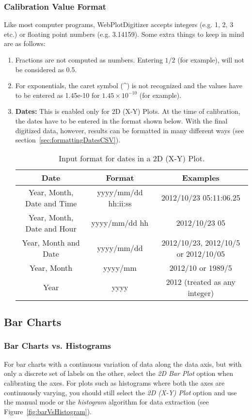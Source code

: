 \documentclass[letterpaper, 11pt]{article}
\begin{document}
\subsubsection{Calibration Value Format}
\label{sec:formattingInput}
Like most computer programs, WebPlotDigitizer accepts integers (e.g. 1, 2, 3 etc.) or floating point numbers (e.g. 3.14159). Some extra things to keep in mind are as follows:
\begin{enumerate}
\item{Fractions are not computed as numbers. Entering $1/2$ (for example), will not be considered as 0.5.}
\item{For exponentials, the caret symbol (\^{}) is not recognized and the values have to be entered as 1.45e-10 for $1.45 \times 10^{-10}$ (for example).}
\item{{\bf Dates:} This is enabled only for 2D (X-Y) Plots. At the time of calibration, the dates have to be entered in the format shown below. With the final digitized data, however, results can be formatted in many different ways (see section~\ref{sec:formattingDatesCSV}).
\begin{center}
\begin{table}[h]	
\caption{Input format for dates in a 2D (X-Y) Plot.}
\begin{tabular}{|c|c|c|}
\hline
Date & Format & Examples\\
\hline
Year, Month, Date and Time & yyyy/mm/dd hh:ii:ss & 2012/10/23 05:11:06.25\\
Year, Month, Date and Hour & yyyy/mm/dd hh & 2012/10/23 05\\ 
Year, Month and Date & yyyy/mm/dd & 2012/10/23, 2012/10/5 or 2012/10/05\\
Year, Month & yyyy/mm & 2012/10 or 1989/5\\
Year & yyyy & 2012 (treated as any integer)\\
\hline
\end{tabular}
\end{table}
\end{center}
}
\end{enumerate}


\subsection{Bar Charts}

\subsubsection{Bar Charts vs. Histograms}
For bar charts with a continuous variation of data along the data axis, but with only a discrete set of labels on the other, select the \emph{2D Bar Plot} option when calibrating the axes. For plots such as histograms where both the axes are continuously varying, you should still select the \emph{2D (X-Y) Plot} option and use the manual mode or the \emph{histogram} algorithm for data extraction (see Figure~\ref{fig:barVsHistogram}).
\end{document}
